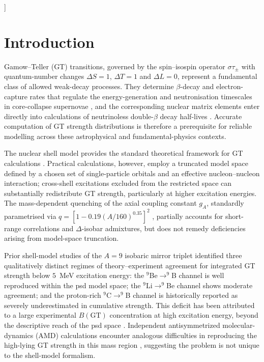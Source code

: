 \documentclass[10pt,twocolumn]{article}
\begin{document}
\begin{@twocolumnfalse}
\begin{abstract}
\medskip
\noindent\textbf{Keywords:} Gamow--Teller transitions, shell model, machine learning, random forest, XGBoost, gradient boosting, SHAP, $A = 9$ mirror triplet, nuclear weak interactions, model-space truncation
\end{abstract}
\end{@twocolumnfalse}
]

\section{Introduction}
\label{sec:intro}

Gamow--Teller (GT) transitions, governed by the spin--isospin operator $\sigma\tau_{\pm}$ with quantum-number changes $\Delta S = 1$, $\Delta T = 1$ and $\Delta L = 0$, represent a fundamental class of allowed weak-decay processes. They determine $\beta$-decay and electron-capture rates that regulate the energy-generation and neutronisation timescales in core-collapse supernovae \cite{ref1,ref2}, and the corresponding nuclear matrix elements enter directly into calculations of neutrinoless double-$\beta$ decay half-lives \cite{ref3}. Accurate computation of GT strength distributions is therefore a prerequisite for reliable modelling across these astrophysical and fundamental-physics contexts.

The nuclear shell model provides the standard theoretical framework for GT calculations \cite{ref4}. Practical calculations, however, employ a truncated model space defined by a chosen set of single-particle orbitals and an effective nucleon--nucleon interaction; cross-shell excitations excluded from the restricted space can substantially redistribute GT strength, particularly at higher excitation energies. The mass-dependent quenching of the axial coupling constant $g_A$, standardly parametrised via $q = [1 - 0.19(A/160)^{0.35}]^2$ \cite{ref12}, partially accounts for short-range correlations and $\Delta$-isobar admixtures, but does not remedy deficiencies arising from model-space truncation.

Prior shell-model studies of the $A = 9$ isobaric mirror triplet \cite{ref5} identified three qualitatively distinct regimes of theory--experiment agreement for integrated GT strength below $5$~MeV excitation energy: the $^{9}$Be$\rightarrow^{9}$B channel is well reproduced within the psd model space; the $^{9}$Li$\rightarrow^{9}$Be channel shows moderate agreement; and the proton-rich $^{9}$C$\rightarrow^{9}$B channel is historically reported as severely underestimated in cumulative strength. This deficit has been attributed to a large experimental $B(\mathrm{GT})$ concentration at high excitation energy, beyond the descriptive reach of the psd space \cite{ref5,ref6}. Independent antisymmetrized molecular-dynamics (AMD) calculations encounter analogous difficulties in reproducing the high-lying GT strength in this mass region \cite{ref7}, suggesting the problem is not unique to the shell-model formalism.
\end{document}
